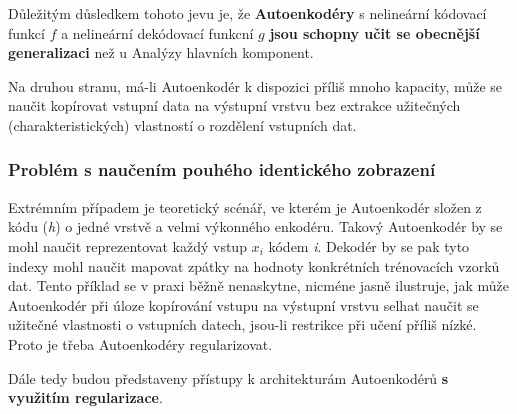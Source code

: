 Důležitým důsledkem tohoto jevu je, že \textbf{Autoenkodéry} s nelineární kódovací funkcí $f$
a nelineární dekódovací funkcní $g$ \textbf{jsou schopny učit se obecnější generalizaci}
než u Analýzy hlavních komponent.

Na druhou stranu, má-li Autoenkodér k dispozici příliš mnoho kapacity,
může se naučit kopírovat vstupní data na výstupní vrstvu bez extrakce užitečných (charakteristických) vlastností o rozdělení vstupních dat.

\subsubsection{Problém s naučením pouhého identického zobrazení}
\label{sec:identity}
Extrémním případem je teoretický scénář, ve kterém je Autoenkodér složen z kódu (\emph{h}) o jedné vrstvě a velmi výkonného enkodéru.
Takový Autoenkodér by se mohl naučit reprezentovat každý vstup $x_i$ kódem \emph{i}.
Dekodér by se pak tyto indexy mohl naučit mapovat zpátky na hodnoty konkrétních trénovacích vzorků dat.
Tento příklad se v praxi běžně nenaskytne, nicméne jasně ilustruje,
jak může Autoenkodér při úloze kopírování vstupu na výstupní vrstvu selhat naučit se užitečné vlastnosti o vstupních datech, jsou-li restrikce při učení příliš nízké.
Proto je třeba Autoenkodéry regularizovat.

Dále tedy budou představeny přístupy k architekturám Autoenkodérů \textbf{s využitím regularizace}.